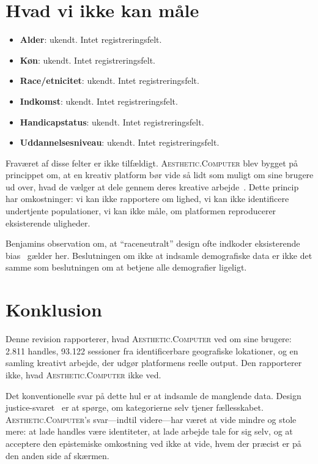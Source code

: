 \documentclass[10pt,letterpaper,twocolumn]{article}
\newcommand{\ac}{\textsc{Aesthetic.Computer}}
\begin{document}
\section{Hvad vi ikke kan måle}

\begin{itemize}
  \item \textbf{Alder}: ukendt. Intet registreringsfelt.
  \item \textbf{Køn}: ukendt. Intet registreringsfelt.
  \item \textbf{Race/etnicitet}: ukendt. Intet registreringsfelt.
  \item \textbf{Indkomst}: ukendt. Intet registreringsfelt.
  \item \textbf{Handicapstatus}: ukendt. Intet registreringsfelt.
  \item \textbf{Uddannelsesniveau}: ukendt. Intet registreringsfelt.
\end{itemize}

Fraværet af disse felter er ikke tilfældigt. \ac{} blev bygget på princippet om, at en kreativ platform bør vide så lidt som muligt om sine brugere ud over, hvad de vælger at dele gennem deres kreative arbejde~\citep{illich1973tools}. Dette princip har omkostninger: vi kan ikke rapportere om lighed, vi kan ikke identificere undertjente populationer, vi kan ikke måle, om platformen reproducerer eksisterende uligheder.

Benjamins observation om, at ``raceneutralt'' design ofte indkoder eksisterende bias~\citep{benjamin2019race} gælder her. Beslutningen om ikke at indsamle demografiske data er ikke det samme som beslutningen om at betjene alle demografier ligeligt.

\section{Konklusion}

Denne revision rapporterer, hvad \ac{} ved om sine brugere: 2.811 handles, 93.122 sessioner fra identificerbare geografiske lokationer, og en samling kreativt arbejde, der udgør platformens reelle output. Den rapporterer ikke, hvad \ac{} ikke ved.

Det konventionelle svar på dette hul er at indsamle de manglende data. Design justice-svaret~\citep{costanzachock2020design} er at spørge, om kategorierne selv tjener fællesskabet. \ac{}'s svar---indtil videre---har været at vide mindre og stole mere: at lade handles være identiteter, at lade arbejde tale for sig selv, og at acceptere den epistemiske omkostning ved ikke at vide, hvem der præcist er på den anden side af skærmen.
\end{document}
